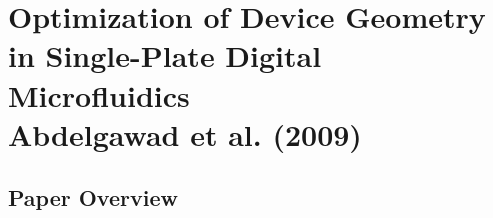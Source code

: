 \chapter[Optimization of Device Geometry in Single-Plate DMF\\{\normalfont Abdelgawad et al. (2009)}]%
{Optimization of Device Geometry in Single-Plate Digital Microfluidics\\[1ex]{\normalfont Abdelgawad et al. (2009)}}

\section{Paper Overview}
